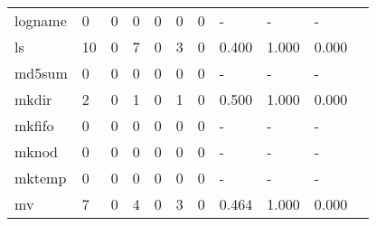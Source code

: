 \begin{longtable}{lp{1.10cm}p{1.10cm}p{1.10cm}p{1.10cm}p{1.10cm}p{1.10cm}p{1.10cm}p{1.10cm}p{1.10cm}p{1.10cm}}
logname   &                      0 &                                  0 &                                 0 &                                0 &                                 0 &                               0 &                              - &                                     - &                                   - \\
ls        &                     10 &                                  0 &                                 7 &                                0 &                                 3 &                               0 &                          0.400 &                                 1.000 &                               0.000 \\
md5sum    &                      0 &                                  0 &                                 0 &                                0 &                                 0 &                               0 &                              - &                                     - &                                   - \\
mkdir     &                      2 &                                  0 &                                 1 &                                0 &                                 1 &                               0 &                          0.500 &                                 1.000 &                               0.000 \\
mkfifo    &                      0 &                                  0 &                                 0 &                                0 &                                 0 &                               0 &                              - &                                     - &                                   - \\
mknod     &                      0 &                                  0 &                                 0 &                                0 &                                 0 &                               0 &                              - &                                     - &                                   - \\
mktemp    &                      0 &                                  0 &                                 0 &                                0 &                                 0 &                               0 &                              - &                                     - &                                   - \\
mv        &                      7 &                                  0 &                                 4 &                                0 &                                 3 &                               0 &                          0.464 &                                 1.000 &                               0.000 \\

\end{longtable}
